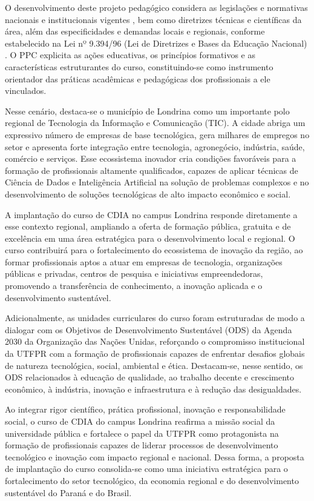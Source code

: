 O desenvolvimento deste projeto pedagógico considera as legislações e normativas nacionais e institucionais vigentes \cite{LDB_1996, UTFPR_RODP_2019}, bem como diretrizes técnicas e científicas da área, além das especificidades e demandas locais e regionais, conforme estabelecido na Lei nº 9.394/96 (Lei de Diretrizes e Bases da Educação Nacional) \cite{LDB_1996}. O PPC explicita as ações educativas, os princípios formativos e as características estruturantes do curso, constituindo-se como instrumento orientador das práticas acadêmicas e pedagógicas dos profissionais a ele vinculados.

Nesse cenário, destaca-se o município de Londrina como um importante polo regional de Tecnologia da Informação e Comunicação (TIC). A cidade abriga um expressivo número de empresas de base tecnológica, gera milhares de empregos no setor e apresenta forte integração entre tecnologia, agronegócio, indústria, saúde, comércio e serviços. Esse ecossistema inovador cria condições favoráveis para a formação de profissionais altamente qualificados, capazes de aplicar técnicas de Ciência de Dados e Inteligência Artificial na solução de problemas complexos e no desenvolvimento de soluções tecnológicas de alto impacto econômico e social.

A implantação do curso de CDIA no campus Londrina responde diretamente a esse contexto regional, ampliando a oferta de formação pública, gratuita e de excelência em uma área estratégica para o desenvolvimento local e regional. O curso contribuirá para o fortalecimento do ecossistema de inovação da região, ao formar profissionais aptos a atuar em empresas de tecnologia, organizações públicas e privadas, centros de pesquisa e iniciativas empreendedoras, promovendo a transferência de conhecimento, a inovação aplicada e o desenvolvimento sustentável.

Adicionalmente, as unidades curriculares do curso foram estruturadas de modo a dialogar com os Objetivos de Desenvolvimento Sustentável (ODS) da Agenda 2030 da Organização das Nações Unidas, reforçando o compromisso institucional da UTFPR com a formação de profissionais capazes de enfrentar desafios globais de natureza tecnológica, social, ambiental e ética. Destacam-se, nesse sentido, os ODS relacionados à educação de qualidade, ao trabalho decente e crescimento econômico, à indústria, inovação e infraestrutura e à redução das desigualdades.

Ao integrar rigor científico, prática profissional, inovação e responsabilidade social, o curso de CDIA do campus Londrina reafirma a missão social da universidade pública e fortalece o papel da UTFPR como protagonista na formação de profissionais capazes de liderar processos de desenvolvimento tecnológico e inovação com impacto regional e nacional. Dessa forma, a proposta de implantação do curso consolida-se como uma iniciativa estratégica para o fortalecimento do setor tecnológico, da economia regional e do desenvolvimento sustentável do Paraná e do Brasil.

